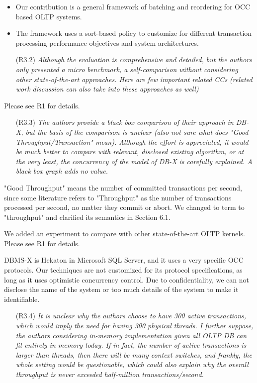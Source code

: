 \documentclass{article}
\newcommand{\todo}[1]{}
\newcommand{\changed}[1]{#1}
\newcommand{\todo}[1]{\textcolor{red}{\bf [TODO!: #1]}}
\newcommand{\changed}[1]{{\color{blue}#1}}
\begin{document}
\todo{Better wording needed}
\changed{
	\begin{itemize}
		\item Our contribution is a general framework of batching and reordering for OCC based OLTP systems.
		\item The framework uses a sort-based policy to customize for different transaction processing performance objectives and system architectures.
	\end{itemize}
}

\begin{itemize}
\item[(R3.2)] \emph{Although the evaluation is comprehensive and detailed, but the authors
	only presented a micro benchmark, a self-comparison without considering
	other state-of-the-art approaches. Here are few important related CCs
	(related work discussion can also take into these approaches as well)}
\end{itemize}

\changed{
	Please see R1 for details.
}

\begin{itemize}
\item[(R3.3)] \emph{The authors provide a black box comparison of their approach in DB-X,
	but the basis of the comparison is unclear (also not sure what does
	"Good Throughput/Transaction" mean). Although the effort is appreciated,
	it would be much better to compare with relevant, disclosed existing
	algorithm, or at the very least, the concurrency of the model of DB-X is
	carefully explained. A black box graph adds no value.}
\end{itemize}

\changed{
	"Good Throughput" means the number of committed transactions per second, since some literature refers to "Throughput" as the number of transactions processed per second, no matter they commit or abort. We changed to term to "throughput" and clarified its semantics in Section 6.1.
	
	We added an experiment to compare with other state-of-the-art OLTP kernels. Please see R1 for details.
	
	DBMS-X is Hekaton in Microsoft SQL Server, and it uses a very specific OCC protocols. Our techniques are not customized for its protocol specifications, as long as it uses optimistic concurrency control. Due to confidentiality, we can not disclose the name of the system or too much details of the system to make it identifiable. 
}


\begin{itemize}
\item[(R3.4)] \emph{It is unclear why the authors choose to have 300 active transactions,
	which would imply the need for having 300 physical threads. I further
	suppose, the authors considering in-memory implementation given all OLTP
	DB can fit entirely in memory today. If in fact, the number of active
	transactions is larger than threads, then there will be many context switches,
	and frankly, the whole setting would be questionable, which could also
	explain why the overall throughput is never exceeded half-million
	transactions/second.}
\end{itemize}
\end{document}
